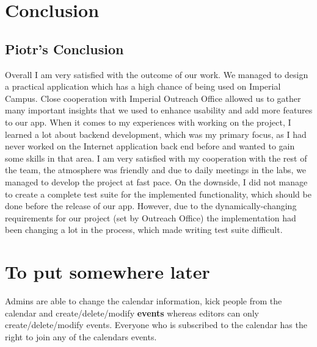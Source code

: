 \documentclass[10pt,a4paper]{article}
\begin{document}
\section{Conclusion}
 \subsection{Piotr's Conclusion}
 Overall I am very satisfied with the outcome of our work. We managed to design a practical application which has a high chance of being used on Imperial Campus. Close cooperation with Imperial Outreach Office allowed us to gather many important insights that we used to enhance usability and add more features to our app. When it comes to my experiences with working on the project, I learned a lot about backend development, which was my primary focus, as I had never worked on the Internet application back end before and wanted to gain some skills in that area. I am very satisfied with my cooperation with the rest of the team, the atmosphere was friendly and due to daily meetings in the labs, we managed to develop the project at fast pace. On the downside, I did not manage to create a complete test suite for the implemented functionality, which should be done before the release of our app. However, due to the dynamically-changing requirements for our project (set by Outreach Office) the implementation had been changing a lot in the process, which made writing test suite difficult. 

\newpage
\newpage
\section{To put somewhere later}
Admins are able to change the calendar information, kick people from the calendar and create/delete/modify \textbf{events} whereas editors can only create/delete/modify events. Everyone who is subscribed to the calendar has the right to join any of the calendars events.
\end{document}
